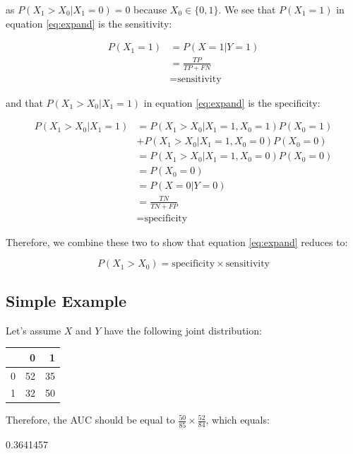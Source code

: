 \documentclass[article]{jss}
\begin{document}
as \(P(X_{1} > X_{0} | X_{1} = 0) = 0\) because \(X_{0} \in \{0, 1\}\).
We see that \(P(X_{1} = 1)\) in equation \eqref{eq:expand} is the
sensitivity:

\begin{align*}
P(X_{1} = 1) &= P(X = 1 | Y = 1)\\
&= \frac{TP}{TP + FN} \\
&= \text{sensitivity}
\end{align*}

and that \(P(X_{1} > X_{0} | X_{1} = 1)\) in equation \eqref{eq:expand}
is the specificity:

\begin{align*}
P(X_{1} > X_{0} | X_{1} = 1) &= P(X_{1} > X_{0} | X_{1} = 1, X_{0} =1) P(X_{0} = 1) \\
&+ P(X_{1} > X_{0} | X_{1} = 1, X_{0} =0) P(X_{0} = 0) \\
&= P(X_{1} > X_{0} | X_{1} = 1, X_{0} =0) P(X_{0} = 0) \\
&= P(X_{0} = 0) \\
&= P(X = 0 | Y = 0)\\
&= \frac{TN}{TN + FP} \\
&= \text{specificity}
\end{align*}

Therefore, we combine these two to show that equation \eqref{eq:expand}
reduces to:

\[
P(X_{1} > X_{0}) = \text{specificity} \times \text{sensitivity}
\]

\hypertarget{simple-example}{%
\subsection{Simple Example}\label{simple-example}}

Let's assume \(X\) and \(Y\) have the following joint distribution:

\begin{tabular}{l|r|r}
\hline
  & 0 & 1\\
\hline
0 & 52 & 35\\
\hline
1 & 32 & 50\\
\hline
\end{tabular}

Therefore, the AUC should be equal to
\(\frac{50}{85} \times \frac{52}{84}\), which equals:

\begin{CodeChunk}

\begin{CodeOutput}
[1] 0.3641457
\end{CodeOutput}
\end{CodeChunk}
\end{document}

